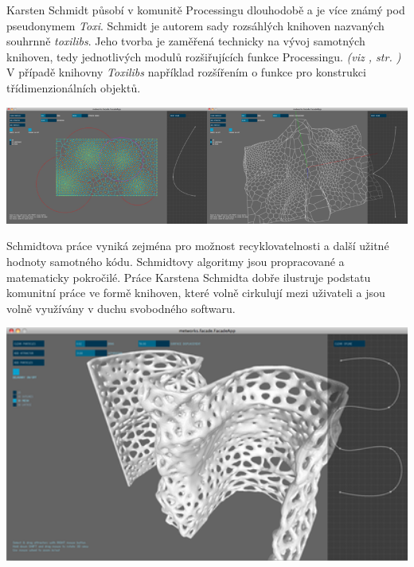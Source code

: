 \documentclass[10pt]{book}
\newcommand{\odkaz}[1]{\textit{(viz \nameref{#1}, str. \pageref*{#1})}}
\begin{document}
Karsten Schmidt působí v komunitě Processingu dlouhodobě a je více známý pod pseudonymem {\em Toxi}. Schmidt je autorem sady rozsáhlých knihoven nazvaných souhrnně {\em toxilibs}. Jeho tvorba je zaměřená technicky na vývoj samotných knihoven, tedy jednotlivých modulů rozšiřujících funkce Processingu. \odkaz{Knihovny} V případě knihovny {\em Toxilibs} například rozšířením o funkce pro konstrukci třídimenzionálních objektů.


\begin{center}
\includegraphics[width = 0.5\textwidth]{imgs/facade-3.png}\includegraphics[width = 0.5\textwidth]{imgs/facade-5.png}

\end{center}

Schmidtova práce vyniká zejména pro možnost recyklovatelnosti a další užitné hodnoty samotného kódu. Schmidtovy algoritmy jsou propracované a matematicky pokročilé. Práce Karstena Schmidta dobře ilustruje podstatu komunitní práce ve formě knihoven, které volně cirkulují mezi uživateli a jsou volně využívány v duchu svobodného softwaru.






\begin{center}
\includegraphics[width = 1\textwidth]{imgs/facade-7.png}
\end{center}
\end{document}
